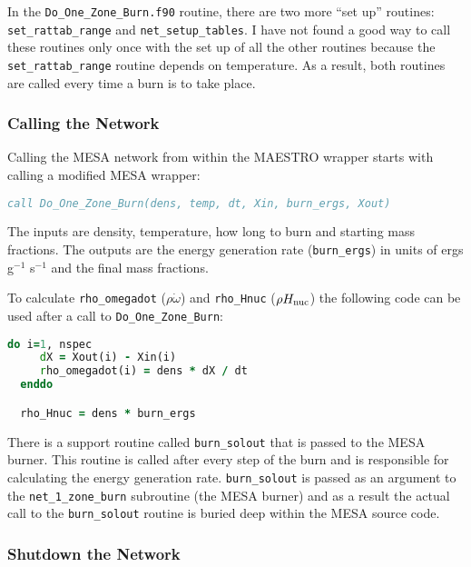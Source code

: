 In the {\tt Do\_One\_Zone\_Burn.f90} routine, there are two more ``set up'' 
routines: {\tt set\_rattab\_range} and {\tt net\_setup\_tables}. I have not 
found a good way to call these routines only once with the set up of all the 
other routines because the {\tt set\_rattab\_range} routine depends on 
temperature. As a result, both routines are called every time a burn is to 
take place.

\subsubsection{Calling the Network}

Calling the {\sf MESA} network from within the {\sf MAESTRO} wrapper starts 
with calling a modified {\sf MESA} wrapper:
\begin{lstlisting}[language=fortran,mathescape=false]
  call Do_One_Zone_Burn(dens, temp, dt, Xin, burn_ergs, Xout)
\end{lstlisting}
The inputs are density, temperature, how long to burn and starting mass 
fractions. The outputs are the energy generation rate ({\tt burn\_ergs}) 
in units of ergs g$^{-1}$ s$^{-1}$ and the final mass fractions. 

To calculate {\tt rho\_omegadot} ($\rho \dot{\omega}$) and {\tt rho\_Hnuc} 
($\rho H_{{\rm nuc}}$) the following code can be used after a call to 
{\tt Do\_One\_Zone\_Burn}:
\begin{lstlisting}[language=fortran,mathescape=false]
  do i=1, nspec
     dX = Xout(i) - Xin(i)
     rho_omegadot(i) = dens * dX / dt
  enddo

  rho_Hnuc = dens * burn_ergs
\end{lstlisting}
There is a support routine called {\tt burn\_solout} that is passed to the 
{\sf MESA} burner. This routine is called after every step of the burn and 
is responsible for calculating the energy generation rate. {\tt burn\_solout} 
is passed as an argument to the {\tt net\_1\_zone\_burn} subroutine (the 
{\sf MESA} burner) and as a result the actual call to the {\tt burn\_solout} 
routine is buried deep within the {\sf MESA} source code.

\subsubsection{Shutdown the Network}

